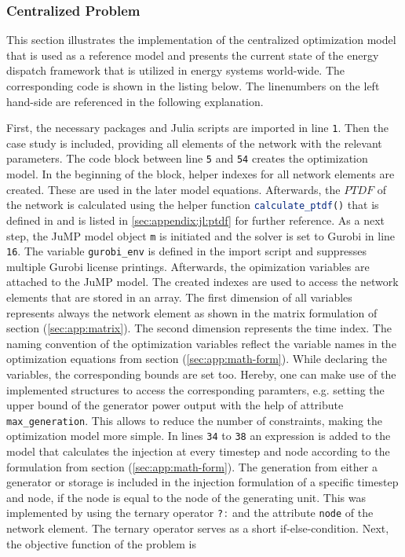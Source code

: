 \subsubsection{Centralized Problem}

This section illustrates the implementation of the centralized optimization model that is used as a reference model and presents the current state of the energy dispatch framework that is utilized in energy systems world-wide. The corresponding code is shown in the listing below. The linenumbers on the left hand-side are referenced in the following explanation.



First, the necessary packages and Julia scripts are imported in line \texttt{1}. Then the case study is included, providing all elements of the network with the relevant parameters. The code block between line \texttt{5} and \texttt{54} creates the optimization model. In the beginning of the block, helper indexes for all network elements are created. These are used in the later model equations. Afterwards, the $PTDF$ of the network is calculated using the helper function \lstinline[language=julia]{calculate_ptdf()} that is defined in  and is listed in \ref{sec:appendix:jl:ptdf} for further reference.  As a next step, the JuMP model object \lstinline[language=julia]{m} is initiated and the solver is set to Gurobi in line \texttt{16}. The variable \lstinline[language=julia]{gurobi_env} is defined in the import script  and suppresses multiple Gurobi license printings. Afterwards, the opimization variables are attached to the JuMP model. The created indexes are used to access the network elements that are stored in an array. The first dimension of all variables represents always the network element as shown in the matrix formulation of section (\ref{sec:app:matrix}). The second dimension represents the time index. The naming convention of the optimization variables reflect the variable names in the optimization equations from section (\ref{sec:app:math-form}). While declaring the variables, the corresponding bounds are set too. Hereby, one can make use of the implemented structures to access the corresponding paramters, e.g. setting the upper bound of the generator power output with the help of attribute \lstinline[language=julia]{max_generation}. This allows to reduce the number of constraints, making the optimization model more simple. In lines \texttt{34} to \texttt{38} an expression is added to the model that calculates the injection at every timestep and node according to the formulation from section (\ref{sec:app:math-form}). The generation from either a generator or storage is included in the injection formulation of a specific timestep and node, if the node is equal to the node of the generating unit. This was implemented by using the ternary operator \lstinline[language=julia]{?:} and the attribute \lstinline[language=julia]{node} of the network element. The ternary operator serves as a short if-else-condition. Next, the objective function of the problem is 